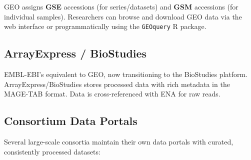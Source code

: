 GEO assigns \textbf{GSE} accessions (for series/datasets) and \textbf{GSM} accessions (for individual samples). Researchers can browse and download GEO data via the web interface or programmatically using the \texttt{GEOquery} R package.

\subsection{ArrayExpress / BioStudies}

EMBL-EBI's equivalent to GEO, now transitioning to the BioStudies platform. ArrayExpress/BioStudies stores processed data with rich metadata in the MAGE-TAB format. Data is cross-referenced with ENA for raw reads.

\subsection{Consortium Data Portals}

Several large-scale consortia maintain their own data portals with curated, consistently processed datasets:

